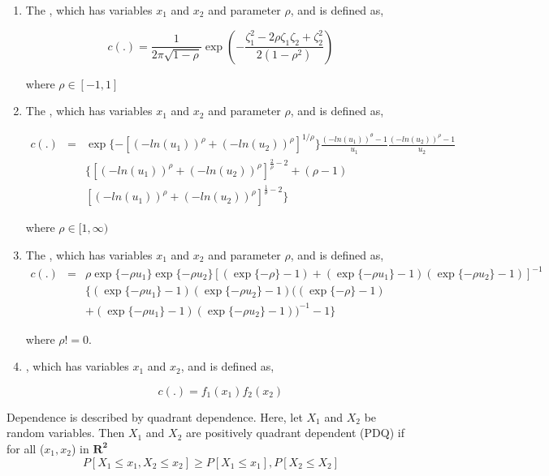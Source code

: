 \begin{enumerate}
	\item The , which has variables $x_1$ and $x_2$ and parameter $\rho$, and is defined as,

	\begin{equation}
	  c(.) = \frac{1}{2\pi \sqrt{1- \rho}} \exp(-\frac{\zeta_1^2 - 2\rho \zeta_1\zeta_2 + \zeta_2^2}{2(1-\rho^2)})
	\end{equation}

	where  $\rho \in{[-1,1]}$

	\item The , which has variables $x_1$ and $x_2$ and parameter $\rho$, and is defined as,

  \begin{eqnarray}
  c(.)&=&\exp\{-[(-ln(u_1))^\rho+(-ln(u_2))^\rho]^{1/\rho}\}\frac{(-ln(u_1))^\theta-1}{u_1}\frac{(-ln(u_2))^\rho-1}{u_2} \nonumber \\
	& &\{[(-ln(u_1))^\rho+(-ln(u_2))^\rho]^{\frac{2}{\rho}-2}+(\rho-1) \nonumber \\
	& & [(-ln(u_1))^\rho+(-ln(u_2))^\rho]^{\frac{1}{\theta}-2}\} 
  \end{eqnarray}

	where  $\rho \in{[1,\infty)}$
	
	\item The , which has variables $x_1$ and $x_2$ and parameter $\rho$, and is defined as,
  \begin{eqnarray}
	c(.)&=&\rho \exp\{-\rho u_1\}\exp\{-\rho u_2\}[(\exp\{-\rho\}-1)+(\exp\{-\rho u_1\}-1)(\exp\{-\rho u_2\}-1)]^{-1} \nonumber \\
	& &\{(\exp\{-\rho u_1\}-1)(\exp\{-\rho u_2\}-1)((\exp\{-\rho\}-1) \nonumber \\
	& & +(\exp\{-\rho u_1\}-1)(\exp\{-\rho u_2\}-1))^{-1} -1 \}
  \end{eqnarray}

	where $\rho != 0$.
	
	\item {}, which has variables $x_1$ and $x_2$, and is defined as,

	\begin{equation}
	  c(.) = f_1(x_1)f_2(x_2)
	\end{equation}		

\end{enumerate}

Dependence is described by quadrant dependence. Here, let $X_1$ and $X_2$ be random variables. Then $X_1$ and $X_2$ are positively quadrant dependent (PDQ) if for all ($x_1,x_2$) in $\boldsymbol{R^2}$
\begin{equation}
  P[X_1\leq x_1, X_2\leq x_2] \geq P[X_1\leq x_1],P[X_2\leq X_2]
\end{equation}


